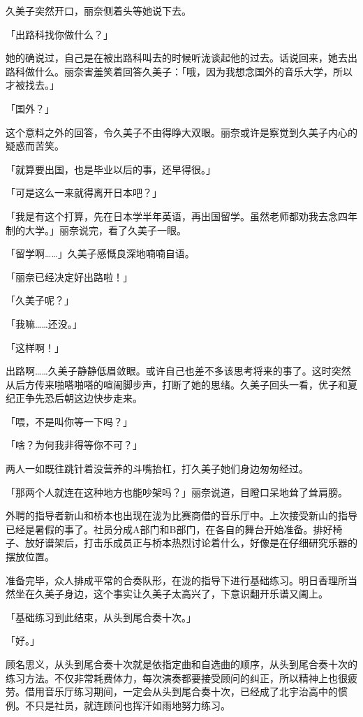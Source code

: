 \documentclass[UTF8]{ctexart}
\begin{document}
    久美子突然开口，丽奈侧着头等她说下去。 

    「出路科找你做什么？」 

    她的确说过，自己是在被出路科叫去的时候听泷谈起他的过去。话说回来，她去出路科做什么。丽奈害羞笑着回答久美子：「哦，因为我想念国外的音乐大学，所以才被找去。」 

    「国外？」 

    这个意料之外的回答，令久美子不由得睁大双眼。丽奈或许是察觉到久美子内心的疑惑而苦笑。 

    「就算要出国，也是毕业以后的事，还早得很。」 

    「可是这么一来就得离开日本吧？」 

    「我是有这个打算，先在日本学半年英语，再出国留学。虽然老师都劝我去念四年制的大学。」丽奈说完，看了久美子一眼。 

    「留学啊……」久美子感慨良深地喃喃自语。 

    「丽奈已经决定好出路啦！」 

    「久美子呢？」 

    「我嘛……还没。」 

    「这样啊！」 

    出路啊……久美子静静低眉敛眼。或许自己也差不多该思考将来的事了。这时突然从后方传来啪嗒啪嗒的喧闹脚步声，打断了她的思绪。久美子回头一看，优子和夏纪正争先恐后朝这边快步走来。 

    「喂，不是叫你等一下吗？」 

    「啥？为何我非得等你不可？」 

    两人一如既往跳针着没营养的斗嘴抬杠，打久美子她们身边匆匆经过。 

    「那两个人就连在这种地方也能吵架吗？」丽奈说道，目瞪口呆地耸了耸肩膀。 

    外聘的指导者新山和桥本也出现在泷为比赛商借的音乐厅中。上次接受新山的指导已经是暑假的事了。社员分成A部门和B部门，在各自的舞台开始准备。排好椅子、放好谱架后，打击乐成员正与桥本热烈讨论着什么，好像是在仔细研究乐器的摆放位置。 

    准备完毕，众人排成平常的合奏队形，在泷的指导下进行基础练习。明日香理所当然坐在久美子身边，这个事实让久美子太高兴了，下意识翻开乐谱又阖上。 

    「基础练习到此结束，从头到尾合奏十次。」 

    「好。」 

    顾名思义，从头到尾合奏十次就是依指定曲和自选曲的顺序，从头到尾合奏十次的练习方法。不仅非常耗费体力，每次演奏都要接受顾问的纠正，所以精神上也很疲劳。借用音乐厅练习期间，一定会从头到尾合奏十次，已经成了北宇治高中的惯例。不只是社员，就连顾问也挥汗如雨地努力练习。 
\end{document}
